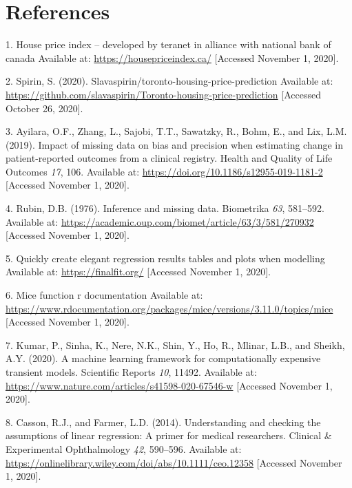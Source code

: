 \documentclass[11pt,]{article}
\begin{document}
\hypertarget{references}{%
\section{References}\label{references}}

\noindent

\hypertarget{refs}{}
\leavevmode\hypertarget{ref-noauthor_house_nodate}{}%
1. House price index -- developed by teranet in alliance with national
bank of canada Available at: \url{https://housepriceindex.ca/}
{[}Accessed November 1, 2020{]}.

\leavevmode\hypertarget{ref-spirin_slavaspirintoronto-housing-price-prediction_2020}{}%
2. Spirin, S. (2020). Slavaspirin/toronto-housing-price-prediction
Available at:
\url{https://github.com/slavaspirin/Toronto-housing-price-prediction}
{[}Accessed October 26, 2020{]}.

\leavevmode\hypertarget{ref-ayilara_impact_2019}{}%
3. Ayilara, O.F., Zhang, L., Sajobi, T.T., Sawatzky, R., Bohm, E., and
Lix, L.M. (2019). Impact of missing data on bias and precision when
estimating change in patient-reported outcomes from a clinical registry.
Health and Quality of Life Outcomes \emph{17}, 106. Available at:
\url{https://doi.org/10.1186/s12955-019-1181-2} {[}Accessed November 1,
2020{]}.

\leavevmode\hypertarget{ref-rubin_inference_1976}{}%
4. Rubin, D.B. (1976). Inference and missing data. Biometrika \emph{63},
581--592. Available at:
\url{https://academic.oup.com/biomet/article/63/3/581/270932}
{[}Accessed November 1, 2020{]}.

\leavevmode\hypertarget{ref-noauthor_quickly_nodate}{}%
5. Quickly create elegant regression results tables and plots when
modelling Available at: \url{https://finalfit.org/} {[}Accessed November
1, 2020{]}.

\leavevmode\hypertarget{ref-noauthor_mice_nodate}{}%
6. Mice function r documentation Available at:
\url{https://www.rdocumentation.org/packages/mice/versions/3.11.0/topics/mice}
{[}Accessed November 1, 2020{]}.

\leavevmode\hypertarget{ref-kumar_machine_2020}{}%
7. Kumar, P., Sinha, K., Nere, N.K., Shin, Y., Ho, R., Mlinar, L.B., and
Sheikh, A.Y. (2020). A machine learning framework for computationally
expensive transient models. Scientific Reports \emph{10}, 11492.
Available at: \url{https://www.nature.com/articles/s41598-020-67546-w}
{[}Accessed November 1, 2020{]}.

\leavevmode\hypertarget{ref-casson_understanding_2014}{}%
8. Casson, R.J., and Farmer, L.D. (2014). Understanding and checking the
assumptions of linear regression: A primer for medical researchers.
Clinical \& Experimental Ophthalmology \emph{42}, 590--596. Available
at: \url{https://onlinelibrary.wiley.com/doi/abs/10.1111/ceo.12358}
{[}Accessed November 1, 2020{]}.
\end{document}
